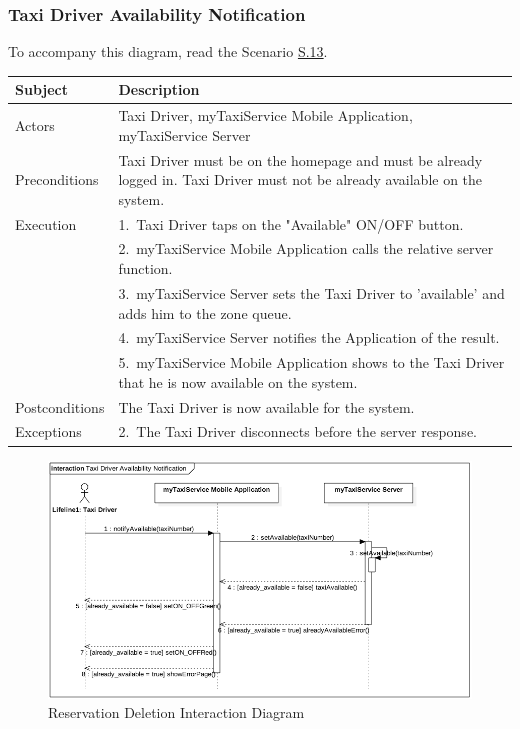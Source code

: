 \subsubsection{Taxi Driver Availability Notification}
			To accompany this diagram, read the Scenario \hyperref[sec:TaxiDriverAvailabilityScenario]{S.13}.

				\begin{table}[htpb]
					\centering
					\label{tab:TaxiDriverAvailabilityTable}
					\begin{tabularx}{\textwidth}{lp{9cm}}
						\hline
						\hline
							\textbf{Subject}
						& 
							\textbf{Description}\\
						\hline
							Actors	       &  Taxi Driver, myTaxiService Mobile Application, myTaxiService Server\\
						\hline
							Preconditions  &  Taxi Driver must be on the homepage and must be already logged in. Taxi Driver must not be already available on the system.\\
						\hline
							Execution      &  1.~Taxi Driver taps on the "Available" ON/OFF button.\\
										   &  2.~myTaxiService Mobile Application calls the relative server function.\\
										   &  3.~myTaxiService Server sets the Taxi Driver to 'available' and adds him to the zone queue.\\
										   &  4.~myTaxiService Server notifies the Application of the result.\\
										   &  5.~myTaxiService Mobile Application shows to the Taxi Driver that he is now available on the system.\\
						\hline
							Postconditions &  The Taxi Driver is now available for the system.\\
						\hline
							Exceptions     &  2.~The Taxi Driver disconnects before the server response.\\
									
						\hline
						\hline
					\end{tabularx}
				\end{table}
				
				\begin{figure}[H]
					\centering
					\includegraphics[width=\textwidth, scale=0.5]{IMG/InteractionDiagrams/TaxiDriverAvailability.png}
					\caption{Reservation Deletion Interaction Diagram}\label{sec:FigureTaxiDriverAvailability}
				\end{figure}